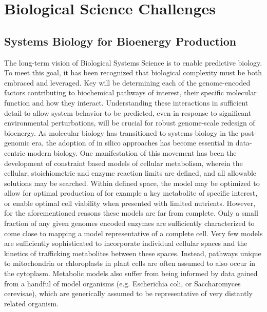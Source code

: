 \documentclass[11pt]{article}
\begin{document}
\section{Biological Science Challenges}
\subsection{Systems Biology for Bioenergy Production}
The long-term vision of Biological Systems Science is to enable predictive biology. To meet this goal, it has been recognized that biological complexity must be both embraced and leveraged. Key will be determining each of the genome-encoded factors contributing to biochemical pathways of interest, their specific molecular function and how they interact. Understanding these interactions in sufficient detail to allow system behavior to be predicted, even in response to significant environmental perturbations, will be crucial for robust genome-scale redesign of bioenergy. 
As molecular biology has transitioned to systems biology in the post-genomic era, the adoption of in silico approaches has become essential in data-centric modern biology. One manifestation of this movement has been the development of constraint based models of cellular metabolism, wherein the cellular, stoichiometric and enzyme reaction limits are defined, and all allowable solutions may be searched. Within defined space, the model may be optimized to allow for optimal production of for example a key metabolite of specific interest, or enable optimal cell viability when presented with limited nutrients. However, for the aforementioned reasons these models are far from complete. Only a small fraction of any given genomes encoded enzymes are sufficiently characterized to come close to mapping a model representative of a complete cell. Very few models are sufficiently sophisticated to incorporate individual cellular spaces and the kinetics of trafficking metabolites between these spaces. Instead, pathways unique to mitochondria or chloroplasts in plant cells are often assumed to also occur in the cytoplasm. Metabolic models also suffer from being informed by data gained from a handful of model organisms (e.g. Escherichia coli, or Saccharomyces cerevisae), which are generically assumed to be representative of very distantly related organism.
\end{document}
